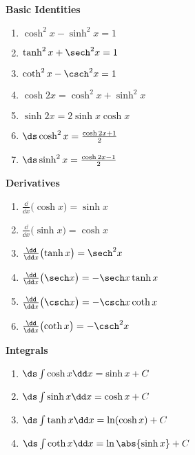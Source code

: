 {
\begin{keyidea}\label{idea:hyperbolic_identities}%
\begin{minipage}[t]{.33\linewidth}
\textbf{Basic Identities}\par
{}%
\begin{enumerate}
\item $\cosh^2x-\sinh^2x=1$
\item	$\tanh^2x+\sech^2x=1$
\item	$\coth^2x-\csch^2x = 1$
\item	$\cosh 2x=\cosh^2x+\sinh^2x$
\item	$\sinh 2x = 2\sinh x\cosh x$
\item	$\ds\cosh^2x = \frac{\cosh 2x+1}{2}$
\item $\ds \sinh^2x=\frac{\cosh 2x-1}{2}$
\end{enumerate}
\end{minipage}%
\begin{minipage}[t]{.33\linewidth}
\textbf{Derivatives}
\begin{enumerate}
\item $\frac{\dd}{\dd x}\bigl(\cosh x\bigr) = \sinh x$
\item $\frac{\dd}{\dd x}\bigl(\sinh x\bigr) = \cosh x$
\item $\frac{\dd}{\dd x}\bigl(\tanh x\bigr) = \sech^2 x$
\item $\frac{\dd}{\dd x}\bigl(\sech x\bigr) = -\sech x\tanh x$
\item $\frac{\dd}{\dd x}\bigl(\csch x\bigr) = -\csch x\coth x$
\item $\frac{\dd}{\dd x}\bigl(\coth x\bigr) = -\csch^2x$
\end{enumerate}
\end{minipage}%
\begin{minipage}[t]{.33\linewidth}
\textbf{Integrals}
\begin{enumerate}
\item $\ds\int \cosh x\dd x = \sinh x+C$
\item $\ds\int \sinh x\dd x = \cosh x+C$
\item $\ds\int \tanh x\dd x = \ln(\cosh x) +C$
\item $\ds\int \coth x\dd x = \ln\abs{\sinh x}+C$
\end{enumerate}
\end{minipage}
\end{keyidea}
}

